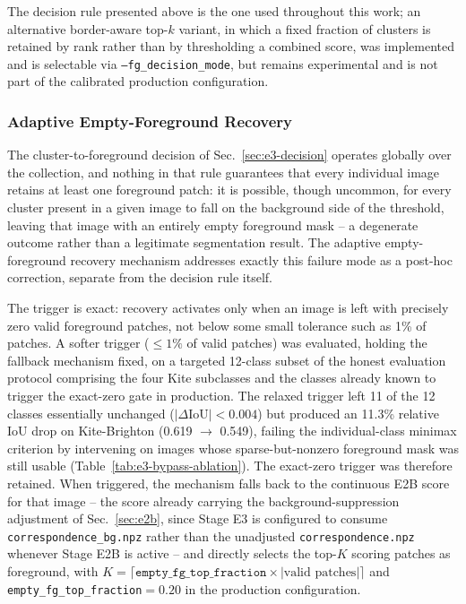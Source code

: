 The decision rule presented above is the one used throughout this work; an alternative border-aware top-$k$ variant, in which a fixed fraction of clusters is retained by rank rather than by thresholding a combined score, was implemented and is selectable via \texttt{--fg\_decision\_mode}, but remains experimental and is not part of the calibrated production configuration.


\subsubsection{Adaptive Empty-Foreground Recovery}
\label{sec:e3-bypass}

The cluster-to-foreground decision of Sec.~\ref{sec:e3-decision} operates globally over the collection, and nothing in that rule guarantees that every individual image retains at least one foreground patch: it is possible, though uncommon, for every cluster present in a given image to fall on the background side of the threshold, leaving that image with an entirely empty foreground mask -- a degenerate outcome rather than a legitimate segmentation result. The adaptive empty-foreground recovery mechanism addresses exactly this failure mode as a post-hoc correction, separate from the decision rule itself.

The trigger is exact: recovery activates only when an image is left with precisely zero valid foreground patches, not below some small tolerance such as 1\% of patches. A softer trigger ($\leq 1\%$ of valid patches) was evaluated, holding the fallback mechanism fixed, on a targeted 12-class subset of the honest evaluation protocol comprising the four Kite subclasses and the classes already known to trigger the exact-zero gate in production. The relaxed trigger left 11 of the 12 classes essentially unchanged ($|\Delta\text{IoU}| < 0.004$) but produced an 11.3\% relative IoU drop on Kite-Brighton (0.619 $\rightarrow$ 0.549), failing the individual-class minimax criterion by intervening on images whose sparse-but-nonzero foreground mask was still usable (Table~\ref{tab:e3-bypass-ablation}). The exact-zero trigger was therefore retained. When triggered, the mechanism falls back to the continuous E2B score for that image -- the score already carrying the background-suppression adjustment of Sec.~\ref{sec:e2b}, since Stage E3 is configured to consume \texttt{correspondence\_bg.npz} rather than the unadjusted \texttt{correspondence.npz} whenever Stage E2B is active -- and directly selects the top-$K$ scoring patches as foreground, with $K = \lceil \texttt{empty\_fg\_top\_fraction} \times |\text{valid patches}| \rceil$ and \texttt{empty\_fg\_top\_fraction}$=0.20$ in the production configuration.

